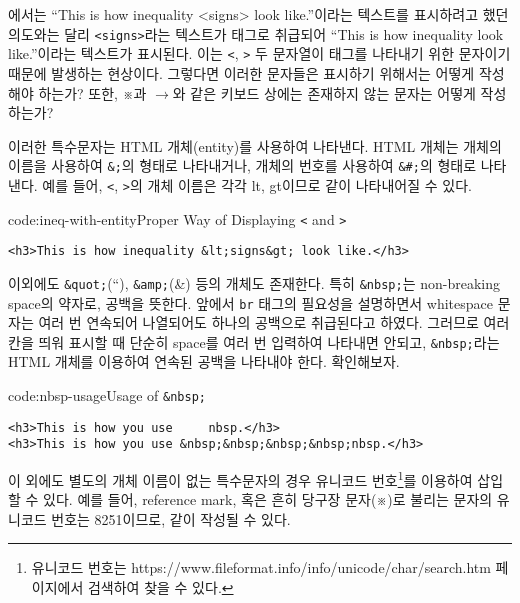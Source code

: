 에서는 ``This is how inequality {\textless}signs{\textgreater} look like.''이라는 텍스트를 표시하려고 했던 의도와는 달리 \texttt{<signs>}라는 텍스트가 태그로 취급되어 ``This is how inequality look like.''이라는 텍스트가 표시된다. 이는 \texttt{<}, \texttt{>} 두 문자열이 태그를 나타내기 위한 문자이기 때문에 발생하는 현상이다. 그렇다면 이러한 문자들은 표시하기 위해서는 어떻게 작성해야 하는가? 또한, ※과 $\rightarrow$와 같은 키보드 상에는 존재하지 않는 문자는 어떻게 작성하는가?

이러한 특수문자는 HTML 개체(entity)를 사용하여 나타낸다. HTML 개체는 개체의 이름을 사용하여 \texttt{\&<entity-name>;}의 형태로 나타내거나, 개체의 번호를 사용하여 \texttt{\&\#<entity-number>;}의 형태로 나타낸다. 예를 들어, \texttt{<}, \texttt{>}의 개체 이름은 각각 lt, gt이므로 \는 \와 같이 나타내어질 수 있다.

\begin{codeenv}{code:ineq-with-entity}{Proper Way of Displaying \texttt{<} and \texttt{>}}\begin{verbatim}
<h3>This is how inequality &lt;signs&gt; look like.</h3>
\end{verbatim}
\end{codeenv}

이외에도 \texttt{\&quot;}(``), \texttt{\&amp;}(\&) 등의 개체도 존재한다. 특히 \texttt{\&nbsp;}는 non-breaking space의 약자로, 공백을 뜻한다. 앞에서 \texttt{br} 태그의 필요성을 설명하면서 whitespace 문자는 여러 번 연속되어 나열되어도 하나의 공백으로 취급된다고 하였다. 그러므로 여러 칸을 띄워 표시할 때 단순히 space를 여러 번 입력하여 나타내면 안되고, \texttt{\&nbsp;}라는 HTML 개체를 이용하여 연속된 공백을 나타내야 한다. \를 확인해보자.

\begin{codeenv}{code:nbsp-usage}{Usage of \texttt{\&nbsp;}}\begin{verbatim}
<h3>This is how you use     nbsp.</h3>
<h3>This is how you use &nbsp;&nbsp;&nbsp;&nbsp;nbsp.</h3>
\end{verbatim}
\end{codeenv}

이 외에도 별도의 개체 이름이 없는 특수문자의 경우 유니코드 번호\footnote{유니코드 번호는 https://www.fileformat.info/info/unicode/char/search.htm 페이지에서 검색하여 찾을 수 있다.}를 이용하여 삽입할 수 있다. 예를 들어, reference mark, 혹은 흔히 당구장 문자(※)로 불리는 문자의 유니코드 번호는 8251이므로, \와 같이 작성될 수 있다.


